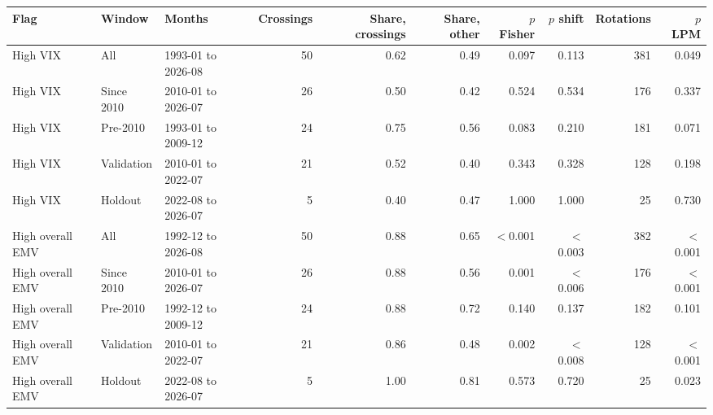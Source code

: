 \begin{tabular}{@{}lllrrrrrrr@{}}
\toprule
Flag & Window & Months & Crossings & Share, crossings & Share, other & $p$ Fisher & $p$ shift & Rotations & $p$ LPM \\
\midrule
High VIX & All & 1993-01 to 2026-08 & 50 & 0.62 & 0.49 & 0.097 & 0.113 & 381 & 0.049 \\
High VIX & Since 2010 & 2010-01 to 2026-07 & 26 & 0.50 & 0.42 & 0.524 & 0.534 & 176 & 0.337 \\
High VIX & Pre-2010 & 1993-01 to 2009-12 & 24 & 0.75 & 0.56 & 0.083 & 0.210 & 181 & 0.071 \\
High VIX & Validation & 2010-01 to 2022-07 & 21 & 0.52 & 0.40 & 0.343 & 0.328 & 128 & 0.198 \\
High VIX & Holdout & 2022-08 to 2026-07 & 5 & 0.40 & 0.47 & 1.000 & 1.000 & 25 & 0.730 \\
High overall EMV & All & 1992-12 to 2026-08 & 50 & 0.88 & 0.65 & $<$0.001 & $<$0.003 & 382 & $<$0.001 \\
High overall EMV & Since 2010 & 2010-01 to 2026-07 & 26 & 0.88 & 0.56 & 0.001 & $<$0.006 & 176 & $<$0.001 \\
High overall EMV & Pre-2010 & 1992-12 to 2009-12 & 24 & 0.88 & 0.72 & 0.140 & 0.137 & 182 & 0.101 \\
High overall EMV & Validation & 2010-01 to 2022-07 & 21 & 0.86 & 0.48 & 0.002 & $<$0.008 & 128 & $<$0.001 \\
High overall EMV & Holdout & 2022-08 to 2026-07 & 5 & 1.00 & 0.81 & 0.573 & 0.720 & 25 & 0.023 \\
\bottomrule
\end{tabular}

